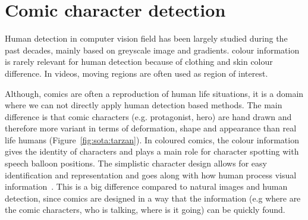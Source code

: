 \section{Comic character detection}
\label{sec:sota:comic_character}



Human detection in computer vision field has been largely studied during the past decades, mainly based on greyscale image and gradients. colour information is rarely relevant for human detection because of clothing and skin colour difference. In videos, moving regions are often used as region of interest.

Although, comics are often a reproduction of human life situations, it is a domain where we can not directly apply human detection based methods.
The main difference is that comic characters (e.g. protagonist, hero) are hand drawn and therefore more variant in terms of deformation, shape and appearance than real life humans (Figure~\ref{fig:sota:tarzan}).
In coloured comics, the colour information gives the identity of characters and plays a main role for character spotting with speech balloon positions. 
The simplistic character design allows for easy identification and representation and goes along with how human process visual information~\cite{ahmadimpactsOfManga,medley2010discerningPictures,cohn2010limits}.
This is a big difference compared to natural images and human detection, since comics are designed in a way that the information (e.g where are the comic characters, who is talking, where is it going) can be quickly found.%

